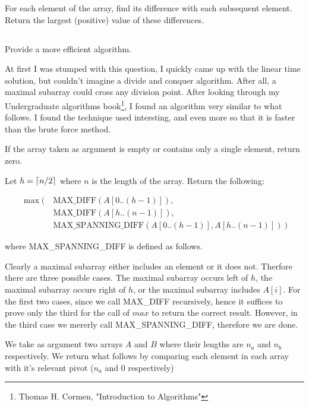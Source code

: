 \documentclass{amsart}
\theoremstyle{definition}
\theoremstyle{remark}
\numberwithin{equation}{section}
\DeclarePairedDelimiter{\ceil}{\lceil}{\rceil}
\begin{document}
For each element of the array, find its difference with each subsequent
element. Return the largest (positive) value of these differences.

\subsection{} Provide a more efficient algorithm.

At first I was stumped with this question, I quickly came up with
the linear time solution, but couldn't imagine a divide and conquer
algorithm. After all, a maximal subarray could cross any division point.
After looking through my Undergraduate algorithms book\footnote{Thomas
H. Cormen, "Introduction to Algorithms"}, I found an algorithm very similar
to what follows. I found the technique used intersting, and even more so that 
it is faster than the brute force method.


If the array taken as argument is empty or contains only a single element, return zero.

Let $h = \ceil{n/2}$ where $n$ is the length of the array. Return the following:

\begin{align*}
  \max(\ & \text{MAX\_DIFF}( A[0..(h-1)] ), \\
        & \text{MAX\_DIFF}( A[h..(n-1)] ), \\
        & \text{MAX\_SPANNING\_DIFF}( A[0..(h-1)], A[h..(n-1)] )\ )
\end{align*}

where MAX\_SPANNING\_DIFF is defined as follows.

\proof 

Clearly a maximal subarray either includes an element or it does not.
Therfore there are three possible cases. The maximal subarray occurs
left of $h$, the maximal subarray occurs right of $h$, or the maximal
subarray includes $A[i]$. For the first two cases, since we call
MAX\_DIFF recursively, hence it suffices to prove only the third for the
call of $max$ to return the correct result. However, in the third case
we mererly call MAX\_SPANNING\_DIFF, therefore we are done.


We take as argument two arrays $A$ and $B$ where their lengths are $n_a$
and $n_b$ respectively. We return what follows by comparing each element in 
each array with it's relevant pivot ($n_a$ and $0$ respectively)
\end{document}
